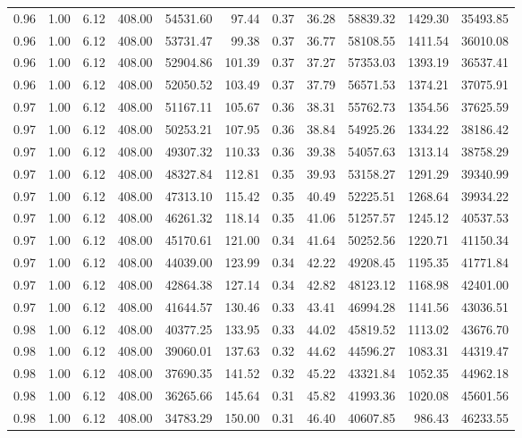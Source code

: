 \begin{table}[!ht]
\begin{tabular}{rrrrrrrrrrr}
0.96 & 1.00 & 6.12 & 408.00 & 54531.60 & 97.44 & 0.37 & 36.28 & 58839.32 & 1429.30 & 35493.85 \\
0.96 & 1.00 & 6.12 & 408.00 & 53731.47 & 99.38 & 0.37 & 36.77 & 58108.55 & 1411.54 & 36010.08 \\
0.96 & 1.00 & 6.12 & 408.00 & 52904.86 & 101.39 & 0.37 & 37.27 & 57353.03 & 1393.19 & 36537.41 \\
0.96 & 1.00 & 6.12 & 408.00 & 52050.52 & 103.49 & 0.37 & 37.79 & 56571.53 & 1374.21 & 37075.91 \\
0.97 & 1.00 & 6.12 & 408.00 & 51167.11 & 105.67 & 0.36 & 38.31 & 55762.73 & 1354.56 & 37625.59 \\
0.97 & 1.00 & 6.12 & 408.00 & 50253.21 & 107.95 & 0.36 & 38.84 & 54925.26 & 1334.22 & 38186.42 \\
0.97 & 1.00 & 6.12 & 408.00 & 49307.32 & 110.33 & 0.36 & 39.38 & 54057.63 & 1313.14 & 38758.29 \\
0.97 & 1.00 & 6.12 & 408.00 & 48327.84 & 112.81 & 0.35 & 39.93 & 53158.27 & 1291.29 & 39340.99 \\
0.97 & 1.00 & 6.12 & 408.00 & 47313.10 & 115.42 & 0.35 & 40.49 & 52225.51 & 1268.64 & 39934.22 \\
0.97 & 1.00 & 6.12 & 408.00 & 46261.32 & 118.14 & 0.35 & 41.06 & 51257.57 & 1245.12 & 40537.53 \\
0.97 & 1.00 & 6.12 & 408.00 & 45170.61 & 121.00 & 0.34 & 41.64 & 50252.56 & 1220.71 & 41150.34 \\
0.97 & 1.00 & 6.12 & 408.00 & 44039.00 & 123.99 & 0.34 & 42.22 & 49208.45 & 1195.35 & 41771.84 \\
0.97 & 1.00 & 6.12 & 408.00 & 42864.38 & 127.14 & 0.34 & 42.82 & 48123.12 & 1168.98 & 42401.00 \\
0.97 & 1.00 & 6.12 & 408.00 & 41644.57 & 130.46 & 0.33 & 43.41 & 46994.28 & 1141.56 & 43036.51 \\
0.98 & 1.00 & 6.12 & 408.00 & 40377.25 & 133.95 & 0.33 & 44.02 & 45819.52 & 1113.02 & 43676.70 \\
0.98 & 1.00 & 6.12 & 408.00 & 39060.01 & 137.63 & 0.32 & 44.62 & 44596.27 & 1083.31 & 44319.47 \\
0.98 & 1.00 & 6.12 & 408.00 & 37690.35 & 141.52 & 0.32 & 45.22 & 43321.84 & 1052.35 & 44962.18 \\
0.98 & 1.00 & 6.12 & 408.00 & 36265.66 & 145.64 & 0.31 & 45.82 & 41993.36 & 1020.08 & 45601.56 \\
0.98 & 1.00 & 6.12 & 408.00 & 34783.29 & 150.00 & 0.31 & 46.40 & 40607.85 & 986.43 & 46233.55 \\

\end{tabular}
\end{table}
